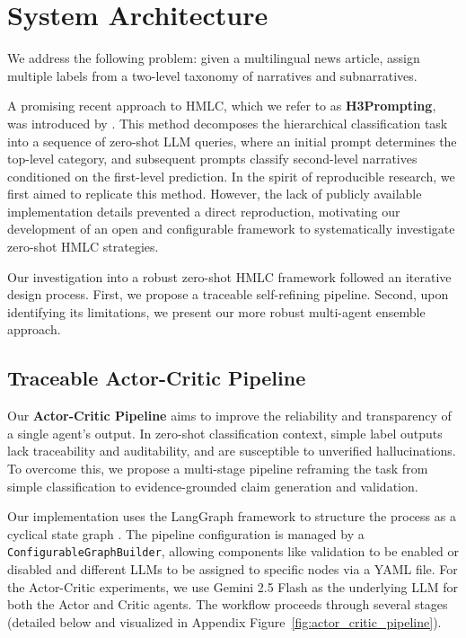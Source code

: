 \section{System Architecture}\label{sec:archi}
We address the following problem: given a multilingual news article, assign multiple labels from a two-level taxonomy of narratives and subnarratives.

A promising recent approach to HMLC, which we refer to as \textbf{H3Prompting}, was introduced by \citet{singh-etal-2025-gatenlp}. 
This method decomposes the hierarchical classification task into a sequence of zero-shot LLM queries, where an initial prompt determines the top-level category, and subsequent prompts classify second-level narratives conditioned on the first-level prediction. 
In the spirit of reproducible research, we first aimed to replicate this method. 
However, the lack of publicly available implementation details prevented a direct reproduction, motivating our development of an open and configurable framework to systematically investigate zero-shot HMLC strategies.

Our investigation into a robust zero-shot HMLC framework followed an iterative design process. 
First, we propose a traceable self-refining pipeline. Second, upon identifying its limitations, we present our more robust multi-agent ensemble approach.




\subsection{Traceable Actor-Critic Pipeline}

Our \textbf{Actor-Critic Pipeline} aims to improve the reliability and transparency of a single agent's output. 
In zero-shot classification context, simple label outputs lack traceability and auditability, and are susceptible to unverified hallucinations. To overcome this, we propose a multi-stage pipeline reframing the task from simple classification to evidence-grounded claim generation and validation.

Our implementation uses the LangGraph framework to structure the process as a cyclical state graph \citep{langgraph2024}. The pipeline configuration is managed by a \texttt{ConfigurableGraphBuilder}, allowing components like validation to be enabled or disabled and different LLMs to be assigned to specific nodes via a YAML file. For the Actor-Critic experiments, we use Gemini 2.5 Flash as the underlying LLM for both the Actor and Critic agents. The workflow proceeds through several stages (detailed below and visualized in Appendix Figure~\ref{fig:actor_critic_pipeline}).

